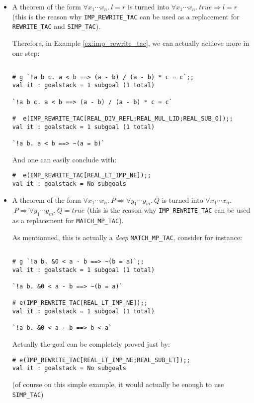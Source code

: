 \documentclass{llncs}
\newcommand*\IMPREWRITETAC{\texttt{IMP\_REWRITE\_TAC}\xspace}
\newcommand*\REWRITETAC{\texttt{REWRITE\_TAC}\xspace}
\newcommand*\SIMPTAC{\texttt{SIMP\_TAC}\xspace}
\newcommand*\MATCHMPTAC{\texttt{MATCH\_MP\_TAC}\xspace}
\begin{document}
		\begin{itemize}
			\item A theorem of the form $\forall x_1\cdots x_n.\ l=r$
        is turned into $\forall x_1\cdots x_n.\ true \Rightarrow l=r$
        (this is the reason why \IMPREWRITETAC can be used as a replacement for
        \REWRITETAC and \SIMPTAC).

        Therefore, in Example \ref{ex:imp_rewrite_tac}, we can actually achieve more in one step:
    \begin{example}
      \label{ex:imp_rewrite_tac_rewrite}
        \begin{verbatim}

# g `!a b c. a < b ==> (a - b) / (a - b) * c = c`;;
val it : goalstack = 1 subgoal (1 total)

`!a b c. a < b ==> (a - b) / (a - b) * c = c`

#  e(IMP_REWRITE_TAC[REAL_DIV_REFL;REAL_MUL_LID;REAL_SUB_0]);;
val it : goalstack = 1 subgoal (1 total)

`!a b. a < b ==> ~(a = b)` \end{verbatim}
        And one can easily conclude with:
        \begin{verbatim}
#  e(IMP_REWRITE_TAC[REAL_LT_IMP_NE]);;
val it : goalstack = No subgoals \end{verbatim}
    \end{example}

			\item A theorem of the form $\forall x_1\cdots x_n.\ P \Rightarrow \forall y_1\cdots y_m.\ Q$
				is turned into $\forall x_1\cdots x_n.$ $\ P \Rightarrow \forall y_1\cdots y_m.\ Q=true$
        (this is the reason why \IMPREWRITETAC can be used as a replacement for \MATCHMPTAC).

        As mentionned, this is actually a \emph{deep} \MATCHMPTAC, consider for instance:
        \begin{example}
        \begin{verbatim}

# g `!a b. &0 < a - b ==> ~(b = a)`;;
val it : goalstack = 1 subgoal (1 total)

`!a b. &0 < a - b ==> ~(b = a)`

# e(IMP_REWRITE_TAC[REAL_LT_IMP_NE]);;
val it : goalstack = 1 subgoal (1 total)

`!a b. &0 < a - b ==> b < a` \end{verbatim}
        Actually the goal can be completely proved just by:
        \begin{verbatim}
# e(IMP_REWRITE_TAC[REAL_LT_IMP_NE;REAL_SUB_LT]);;
val it : goalstack = No subgoals \end{verbatim}
        (of course on this simple example, it would actually be enough to use \SIMPTAC)
      \end{example}


\end{itemize}
\end{document}
